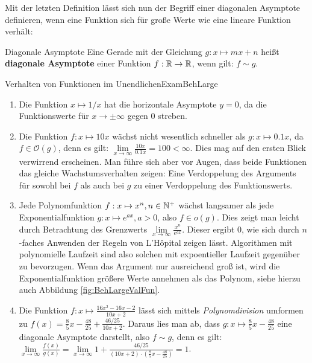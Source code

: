 Mit der letzten Definition lässt sich nun der Begriff einer diagonalen Asymptote definieren, wenn eine Funktion sich für große Werte wie eine lineare Funktion verhält:

\begin{definition}{Diagonale Asymptote}
    Eine Gerade mit der Gleichung $g: x \mapsto mx+n$ heißt \textbf{diagonale Asymptote} einer Funktion $f: \mathbb{R} \to \mathbb{R}$, wenn gilt: $f \sim g$.
\end{definition}

\begin{example}{Verhalten von Funktionen im Unendlichen}{ExamBehLarge}
    \begin{enumerate}
        \item Die Funktion $x \mapsto 1/x$ hat die horizontale Asymptote $y=0$, da die Funktionswerte für $x \to \pm\infty$ gegen $0$ streben.
        \item Die Funktion $f: x \mapsto 10x$ wächst nicht wesentlich schneller als $g: x \mapsto 0.1x$, da $f \in \mathcal{O}(g)$, denn es gilt: $\lim\limits_{x\to\infty} \frac{10x}{0.1x} = 100 < \infty$. Dies mag auf den ersten Blick verwirrend erscheinen. Man führe sich aber vor Augen, dass beide Funktionen das gleiche Wachstumsverhalten zeigen: Eine Verdoppelung des Arguments für sowohl bei $f$ als auch bei $g$ zu einer Verdoppelung des Funktionswerts.
        \item Jede Polynomfunktion $f: x \mapsto x^n, n \in \mathbb{N}^+$ wächst langsamer als jede Exponentialfunktion $g: x \mapsto e^{ax}, a > 0$, also $f \in o(g)$. Dies zeigt man leicht durch Betrachtung des Grenzwerts $\lim\limits_{x\to\infty} \frac{x^n}{e^{ax}}$. Dieser ergibt $0$, wie sich durch $n$-faches Anwenden der Regeln von L'Hôpital zeigen lässt. Algorithmen mit polynomielle Laufzeit sind also solchen mit expoentieller Laufzeit gegenüber zu bevorzugen. Wenn das Argument nur ausreichend groß ist, wird die Exponentialfunktion größere Werte annehmen als das Polynom, siehe hierzu auch Abbildung \ref{fig:BehLargeValFun}.
        \item Die Funktion $f: x \mapsto \frac{16x^2-16x-2}{10x+2}$ lässt sich mittels \emph{Polynomdivision} umformen zu $f(x) = \frac{8}{5}x - \frac{48}{25} + \frac{46/25}{10x+2}$. Daraus lies man ab, dass $g: x \mapsto \frac{8}{5}x - \frac{48}{25}$ eine diagonale Asymptote darstellt, also $f \sim g$, denn es gilt: $\lim\limits_{x\to\infty} \frac{f(x)}{g(x)} = \lim\limits_{x\to\infty} 1 + \frac{46/25}{(10x+2)\cdot(\frac{8}{5}x - \frac{48}{25})} = 1$.
    \end{enumerate}
\end{example}

